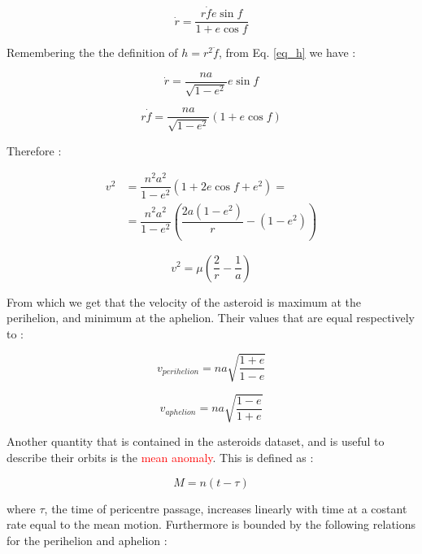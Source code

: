 \documentclass[12pt,%
               a4paper,%
               oneside,openany,%
               titlepage,%
               headinclude,footinclude,%
               BCOR5mm,%
               cleardoublepage=empty,%
               tablecaptionabove,%
               floatperchapter,
               ]{scrreprt}                 %
\begin{document}
\begin{equation}
\dot{r}=\frac{r\dot{f}e\sin f}{1+e\cos f}
\end{equation}


Remembering the the definition of $h=r^{2}\ddot{f}$, from Eq. \ref{eq_h} we have  \cite{murray1999solar}:

\begin{equation}
\dot{r}=\frac{na}{\sqrt{1-e^{2}}}e\sin f
\end{equation}

\begin{equation}
r\dot{f}=\frac{na}{\sqrt{1-e^{2}}}\left(1+e\cos f\right)
\end{equation}

Therefore \cite{murray1999solar}:


\begin{equation}
\begin{split}
v^{2}&=\dfrac{n^{2}a^{2}}{1-e^{2}}\left(1+2e\cos f +e^{2}\right)= \\
&=\dfrac{n^{2}a^{2}}{1-e^{2}}\left(\dfrac{2a(1-e^{2})}{r}-(1-e^{2})\right)
\end{split}
\end{equation}

\begin{equation}
v^{2}=\mu\left(\frac{2}{r}-\dfrac{1}{a}\right)
\end{equation}


From which we get that the velocity of the asteroid is maximum at the perihelion, and minimum at the aphelion. Their values that are equal respectively to \cite{murray1999solar}:

\begin{equation}
v_{perihelion}=na\sqrt{\dfrac{1+e}{1-e}}
\end{equation}

\begin{equation}
v_{aphelion}=na\sqrt{\dfrac{1-e}{1+e}}
\end{equation}

Another quantity that is contained in the asteroids dataset, and is useful to describe their orbits is the \textcolor{red}{mean anomaly}. This is defined as \cite{murray1999solar}:

\begin{equation}
M=n(t-\tau)
\end{equation}

where $\tau$, the time of pericentre passage, increases linearly with time at a costant rate equal to the mean motion. Furthermore is bounded by the following relations for the perihelion and aphelion \cite{murray1999solar}:
\end{document}
